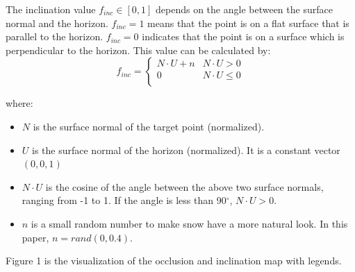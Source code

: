 \documentclass{article}
\begin{document}
The inclination value \( f_{inc} \in [0, 1] \) depends on the angle between the surface normal and the horizon. \( f_{inc}=1 \) means 
that the point is on a flat surface that is parallel to the horizon. \( f_{inc}=0 \) indicates that the point is on a surface which is 
perpendicular to the horizon. This value can be calculated by:
\[
  f_{inc}=
  \left\{
    \begin{array}{ll}
      N \cdot U + n & N \cdot U > 0 \\
      0 & N \cdot U \leq 0 \\
    \end{array} 
  \right. 
\]

where:
\begin{itemize}
  \item \( N \) is the surface normal of the target point (normalized).
  \item \( U \) is the surface normal of the horizon (normalized). It is a constant vector \((0, 0, 1)\)
  \item \( N \cdot U \) is the cosine of the angle between the above two surface normals, ranging from -1 to 1. If the angle is less 
  than 90$^{\circ}$, \( N \cdot U > 0\).
  \item \( n \) is a small random number to make snow have a more natural look. In this paper, \(n = rand(0, 0.4)\).
\end{itemize}

Figure 1 is the visualization of the occlusion and inclination map with legends. 
\end{document}

